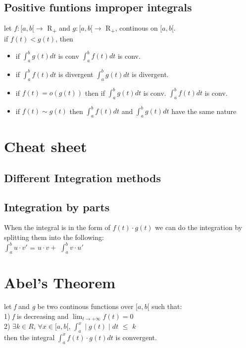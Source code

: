 \documentclass{article}
\begin{document}
\subsection{Positive funtions improper integrals}
let $f: [ a, b [ \rightarrow $ R\textsubscript{+} and $g: [ a, b [ \rightarrow $ R\textsubscript{+}, continous on $ [a, b [ $.\\
if $f(t) < g(t)$, then\\
\begin{itemize}
    \item if $\int _ { a } ^ { b } g ( t ) d t$ is conv \Rightarrow $\int _ { a } ^ { b } f ( t ) d t$ is conv.\\ 
    \item if $\int _ { a } ^ { b } f ( t ) d t$ is divergent \Rightarrow $\int _ { a } ^ { b } g ( t ) d t$ is divergent.\\
    \item if $f(t) =  o (g(t)) $ then if $\int _ { a } ^ { b } g ( t ) d t$ is conv. \Rightarrow $\int _ { a } ^ { b } f ( t ) d t$ is conv.\\
    \item if $f(t) \sim g(t) $ then $\int _ { a } ^ { b } f ( t ) d t$ and $\int _ { a } ^ { b } g ( t ) d t $ have the same nature\\ 
\end{itemize}
\section{Cheat sheet}
\subsection{Different Integration methods}
\subsection{Integration by parts}
When the integral is in the form of $f(t)\cdot g(t)$ we can do the integration by splitting them into the following:\\
$\int_{a}^{b} u \cdot v'$ = $u\cdot v + $ $\int_{a}^{b} v\cdot u'$\\
\section{Abel's Theorem}
let \textit{f} and \textit{g} be two continous functions over $[a, b[$ such that:\\
1) \textit{f} is decreasing and $\lim_{t \to +\infty} f(t) = 0$\\
2) $\exists k \in R$, $\forall x \in [ a, b [$, $\int_{a}^{x} \mid g(t) \mid dt $ $\leq$ $k$\\
then the integral $\int_{a}^{x} f(t) \cdot g(t) dt$ is convergent.\\
\end{document}
